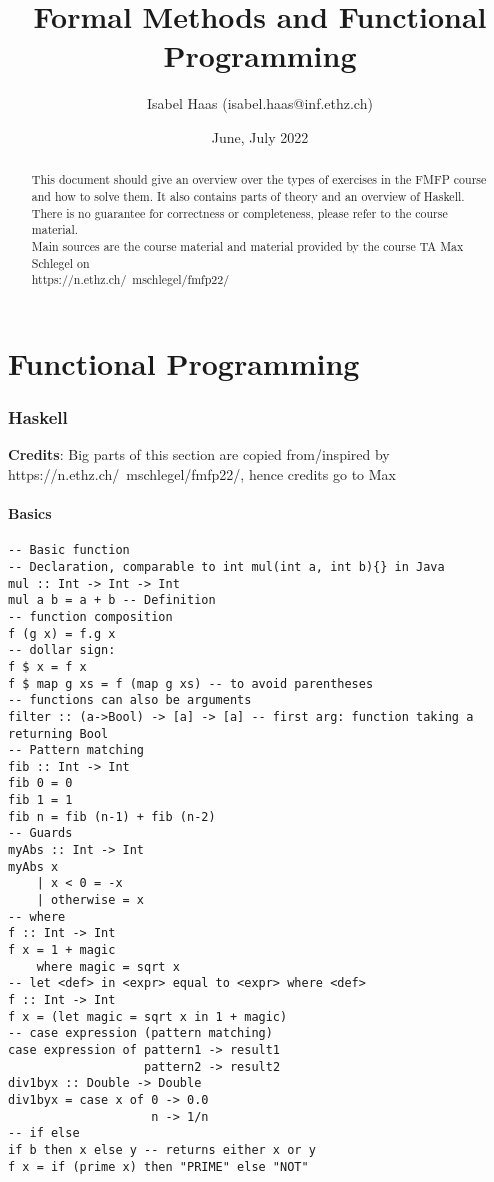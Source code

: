 \documentclass[11.5pt]{article}
\title{Formal Methods and Functional Programming}
\author{Isabel Haas (isabel.haas@inf.ethz.ch)}
\date{June, July 2022}
\begin{document}
\maketitle

\begin{abstract}
This document should give an overview over the types of exercises in the FMFP course and how to solve them. 
It also contains parts of theory and an overview of Haskell. \\
There is no guarantee for correctness or completeness, please refer to the course material. \\
Main sources are the course material and material provided by the course TA
Max Schlegel on \\ https://n.ethz.ch/~mschlegel/fmfp22/
\end{abstract}

\thispagestyle{empty}
\tableofcontents

\newpage

\part*{Functional Programming}
\setcounter{section}{0}
\renewcommand*{\theHsection}{chX.\the\value{section}}

\section{Haskell}
\textbf{Credits}: Big parts of this section are copied from/inspired by https://n.ethz.ch/~mschlegel/fmfp22/, hence credits go to Max
\setcounter{page}{1}
\subsection{Basics}
\begin{verbatim}
-- Basic function
-- Declaration, comparable to int mul(int a, int b){} in Java
mul :: Int -> Int -> Int 
mul a b = a + b -- Definition
-- function composition
f (g x) = f.g x
-- dollar sign:
f $ x = f x
f $ map g xs = f (map g xs) -- to avoid parentheses 
-- functions can also be arguments
filter :: (a->Bool) -> [a] -> [a] -- first arg: function taking a returning Bool
-- Pattern matching
fib :: Int -> Int
fib 0 = 0
fib 1 = 1
fib n = fib (n-1) + fib (n-2)
-- Guards
myAbs :: Int -> Int 
myAbs x
    | x < 0 = -x
    | otherwise = x
-- where 
f :: Int -> Int
f x = 1 + magic 
    where magic = sqrt x
-- let <def> in <expr> equal to <expr> where <def>
f :: Int -> Int
f x = (let magic = sqrt x in 1 + magic)
-- case expression (pattern matching)
case expression of pattern1 -> result1
                   pattern2 -> result2
div1byx :: Double -> Double
div1byx = case x of 0 -> 0.0
                    n -> 1/n
-- if else
if b then x else y -- returns either x or y
f x = if (prime x) then "PRIME" else "NOT" 
\end{verbatim}
\end{document}
